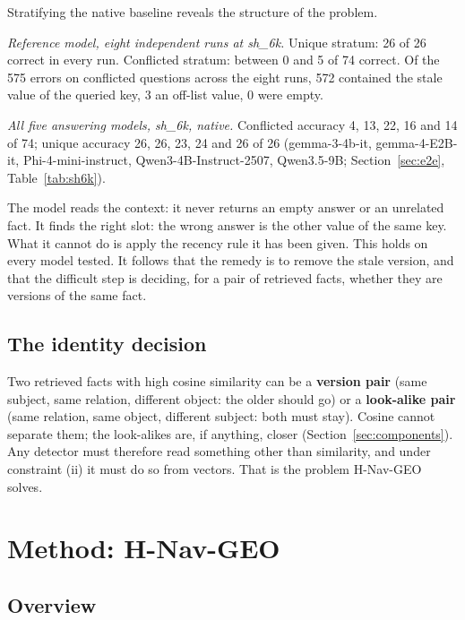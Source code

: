 \documentclass[journal=jcisd8,manuscript=article]{achemso}
\begin{document}
Stratifying the native baseline reveals the structure of the problem.

\emph{Reference model, eight independent runs at sh\_6k.} Unique stratum: 26 of 26 correct in every run. Conflicted stratum: between 0 and 5 of 74 correct. Of the 575 errors on conflicted questions across the eight runs, 572 contained the stale value of the queried key, 3 an off-list value, 0 were empty.

\emph{All five answering models, sh\_6k, native.} Conflicted accuracy 4, 13, 22, 16 and 14 of 74; unique accuracy 26, 26, 23, 24 and 26 of 26 (gemma-3-4b-it, gemma-4-E2B-it, Phi-4-mini-instruct, Qwen3-4B-Instruct-2507, Qwen3.5-9B; Section~\ref{sec:e2e}, Table~\ref{tab:sh6k}).

The model reads the context: it never returns an empty answer or an unrelated fact. It finds the right slot: the wrong answer is the other value of the same key. What it cannot do is apply the recency rule it has been given. This holds on every model tested. It follows that the remedy is to remove the stale version, and that the difficult step is deciding, for a pair of retrieved facts, whether they are versions of the same fact.

\subsection{The identity decision}

Two retrieved facts with high cosine similarity can be a \textbf{version pair} (same subject, same relation, different object: the older should go) or a \textbf{look-alike pair} (same relation, same object, different subject: both must stay). Cosine cannot separate them; the look-alikes are, if anything, closer (Section~\ref{sec:components}). Any detector must therefore read something other than similarity, and under constraint (ii) it must do so from vectors. That is the problem H-Nav-GEO solves.

\section{Method: H-Nav-GEO}
\label{sec:method}

\subsection{Overview}
\label{sec:overview}
\end{document}

